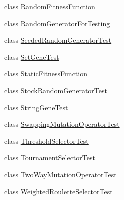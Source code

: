 \begin{DoxyCompactItemize}
\item 
class \hyperlink{classorg_1_1jgap_1_1impl_1_1_random_fitness_function}{Random\-Fitness\-Function}
\item 
class \hyperlink{classorg_1_1jgap_1_1impl_1_1_random_generator_for_testing}{Random\-Generator\-For\-Testing}
\item 
class \hyperlink{classorg_1_1jgap_1_1impl_1_1_seeded_random_generator_test}{Seeded\-Random\-Generator\-Test}
\item 
class \hyperlink{classorg_1_1jgap_1_1impl_1_1_set_gene_test}{Set\-Gene\-Test}
\item 
class \hyperlink{classorg_1_1jgap_1_1impl_1_1_static_fitness_function}{Static\-Fitness\-Function}
\item 
class \hyperlink{classorg_1_1jgap_1_1impl_1_1_stock_random_generator_test}{Stock\-Random\-Generator\-Test}
\item 
class \hyperlink{classorg_1_1jgap_1_1impl_1_1_string_gene_test}{String\-Gene\-Test}
\item 
class \hyperlink{classorg_1_1jgap_1_1impl_1_1_swapping_mutation_operator_test}{Swapping\-Mutation\-Operator\-Test}
\item 
class \hyperlink{classorg_1_1jgap_1_1impl_1_1_threshold_selector_test}{Threshold\-Selector\-Test}
\item 
class \hyperlink{classorg_1_1jgap_1_1impl_1_1_tournament_selector_test}{Tournament\-Selector\-Test}
\item 
class \hyperlink{classorg_1_1jgap_1_1impl_1_1_two_way_mutation_operator_test}{Two\-Way\-Mutation\-Operator\-Test}
\item 
class \hyperlink{classorg_1_1jgap_1_1impl_1_1_weighted_roulette_selector_test}{Weighted\-Roulette\-Selector\-Test}
\end{DoxyCompactItemize}
